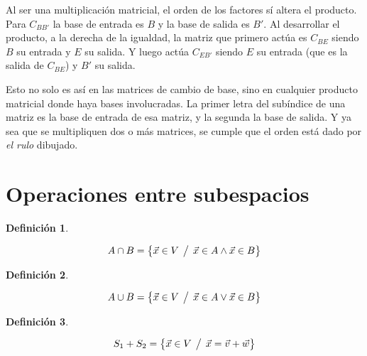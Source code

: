 \documentclass[a5paper,12pt,twoside]{book}
\newtheorem{defn}{{Definición}}[chapter]
\begin{document}
Al ser una multiplicación matricial, el orden de los factores sí altera el producto. Para $C_{BB'}$ la base de entrada es $B$ y la base de salida es $B'$. Al desarrollar el producto, a la derecha de la igualdad, la matriz que primero actúa es $C_{BE}$ siendo $B$ su entrada y $E$ su salida. Y luego actúa $C_{EB'}$ siendo $E$ su entrada (que es la salida de $C_{BE}$) y $B'$ su salida.

\begin{center}
    \def\svgwidth{0.4\linewidth}
    
\end{center}

Esto no solo es así en las matrices de cambio de base, sino en cualquier producto matricial donde haya bases involucradas. La primer letra del subíndice de una matriz es la base de entrada de esa matriz, y la segunda la base de salida. Y ya sea que se multipliquen dos o más matrices, se cumple que el orden está dado por \emph{el rulo} dibujado.


\section{Operaciones entre subespacios}

\begin{mdframed}[style=MyFrame1]
    \begin{defn}
    \end{defn}
    \begin{equation*}
        A \cap B = { \left\{ {\Vec{x} \in V \hspace{1ex} \big/ \hspace{1ex} \Vec{x}\in A \land \Vec{x}\in B} \right\} }
    \end{equation*}
\end{mdframed}

\begin{mdframed}[style=MyFrame1]
    \begin{defn}
    \end{defn}
    \begin{equation*}
        A \cup B = { \left\{ {\Vec{x} \in V \hspace{1ex} \big/ \hspace{1ex} \Vec{x}\in A \lor \Vec{x}\in B} \right\} }
    \end{equation*}
\end{mdframed}

\begin{mdframed}[style=MyFrame1]
    \begin{defn}
    \end{defn}
    \begin{equation*}
        S_1 + S_2 = { \left\{ {\Vec{x} \in V \hspace{1ex} \big/ \hspace{1ex} \Vec{x}=\Vec{v}+\Vec{w}} \right\} }
    \end{equation*}
\end{mdframed}
\end{document}
